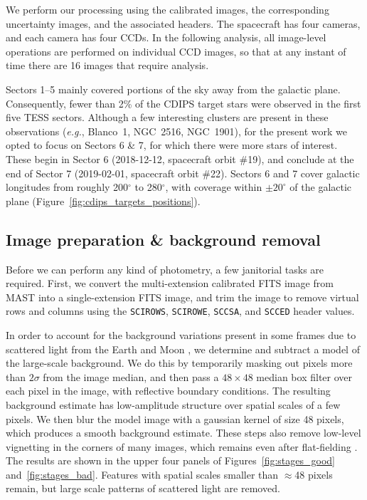 \documentclass[12pt,twocolumn,tighten]{aastex62}
\begin{document}
We perform our processing using the calibrated images, the
corresponding uncertainty images, and the associated headers.  The
spacecraft has four cameras, and each camera has four CCDs.  In the
following analysis, all image-level operations are performed on
individual CCD images, so that at any instant of time there are 16
images that require analysis.

Sectors 1--5 mainly covered portions of the sky away from the galactic
plane.  Consequently, fewer than 2\% of the CDIPS target stars were
observed in the first five TESS sectors.  Although a few interesting
clusters are present in these observations ({\it e.g.}, Blanco~1,
NGC~2516, NGC~1901), for the present work we opted to focus on Sectors
6 \& 7, for which there were more stars of interest.  These begin in
Sector 6 (2018-12-12, spacecraft orbit \#19), and conclude at the end
of Sector 7 (2019-02-01, spacecraft orbit \#22).  Sectors 6 and 7
cover galactic longitudes from roughly 200$^\circ$ to 280$^\circ$,
with coverage within $\pm 20^\circ$ of the galactic plane
(Figure~\ref{fig:cdips_targets_positions}).


\subsection{Image preparation \& background removal}
\label{subsec:preparation}

Before we can perform any kind of photometry, a few janitorial tasks
are required.  First, we convert the multi-extension calibrated FITS
image from MAST into a single-extension FITS image, and trim the image
to remove virtual rows and columns using the \texttt{SCIROWS},
\texttt{SCIROWE}, \texttt{SCCSA}, and \texttt{SCCED} header values.

In order to account for the background variations present in some
frames due to scattered light from the Earth and Moon \citep[see][\S
7.3.1--7.3.4]{vanderspek_2018}, we determine and subtract a model of
the large-scale background.  We do this by temporarily masking out
pixels more than $2\sigma$ from the image median, and then pass a
$48\times48$ median box filter over each pixel in the image, with
reflective boundary conditions.  The resulting background estimate has
low-amplitude structure over spatial scales of a few pixels. We then
blur the model image with a gaussian kernel of size 48 pixels, which
produces a smooth background estimate.  These steps also remove
low-level vignetting in the corners of many images, which remains even
after flat-fielding \citep[see][\S 7.3.5]{vanderspek_2018}.  The
results are shown in the upper four panels of
Figures~\ref{fig:stages_good} and~\ref{fig:stages_bad}.  Features with
spatial scales smaller than $\approx$48 pixels remain, but large scale
patterns of scattered light are removed.
\end{document}
